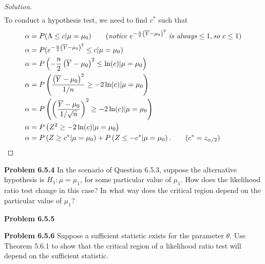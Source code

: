 \documentclass{article}
\begin{document}
\begin{proof}[Solution]
\begin{align*}
    \end{align*}
    To conduct a hypothesis test, we need to find $c^*$ such that
    \begin{align*}
        \alpha & = P(\Lambda \leq c|\mu = \mu_0) \qquad (\emph{notice $e^{-\frac{n}{2}\left(\overline{Y} - \mu_0\right)^2}$ is always} \le 1, \emph{so } c \le 1) \\
        \alpha & = P(e^{-\frac{n}{2}\left(\overline{Y} - \mu_0\right)^2} \le c | \mu = \mu_0) \\
        \alpha & = P\left(-\frac{n}{2}\left(\overline{Y} - \mu_0\right)^2 \le \ln(c) | \mu = \mu_0\right) \\
        \alpha & = P\left(\frac{\left(\overline{Y} - \mu_0\right)^2}{1/n} \ge -2\ln(c) | \mu = \mu_0\right) \\
        \alpha & = P\left(\left(\frac{\overline{Y} - \mu_0}{1/\sqrt{n}}\right)^2 \ge -2\ln(c) | \mu = \mu_0\right) \\
        \alpha & = P\left(Z^2 \ge -2\ln(c) | \mu = \mu_0\right) \\
        \alpha & = P\left(Z \ge c^* | \mu = \mu_0\right) + P\left(Z \le -c^* | \mu = \mu_0\right). \qquad (c^* = z_{\alpha/2})
    \end{align*}
\end{proof}
\bigbreak


\textbf{Problem 6.5.4}
In the scenario of Question 6.5.3, suppose the alternative hypothesis is $H_1: \mu = \mu_1$, 
for some particular value of $\mu_1$. How does the likelihood ratio test change in this case? 
In what way does the critical region depend on the particular value of $\mu_1$?
\bigbreak


\textbf{Problem 6.5.5}

\bigbreak


\textbf{Problem 6.5.6}
Suppose a sufficient statistic exists for the parameter $\theta$. 
Use Theorem 5.6.1 to show that the critical region of a likelihood ratio test 
will depend on the sufficient statistic.
\end{document}
